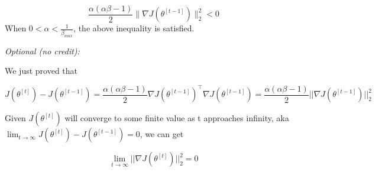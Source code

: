 \begin{answer}
\begin{equation}
     \frac{\alpha(\alpha \beta - 1)}{2} \|\nabla J(\theta^{[t-1]}) \|_2^2 < 0
\end{equation}
When $0 < \alpha < \frac{1}{\beta_{max}}$, the above inequality is satisfied.


\textit{Optional (no credit):}

We just proved that 

\begin{equation*}
J(\theta^{[t]}) - J(\theta^{[t - 1]}) = \frac{\alpha(\alpha \beta - 1)}{2} \nabla J(\theta^{[t-1]})^\top \nabla J(\theta^{[t-1]}) = \frac{\alpha(\alpha \beta - 1)}{2} ||\nabla J(\theta^{[t - 1]})||_{2}^{2}
\end{equation*}

Given $J(\theta^{[t]})$ will converge to some finite value as t approaches infinity,  aka $\lim_{t\to\infty} J(\theta^{[t]}) - J(\theta^{[t - 1]}) = 0$, we can get 

\begin{equation*}
\lim_{t\to\infty}||\nabla J(\theta^{[t]})||_{2}^{2}=0
\end{equation*}

\end{answer}

